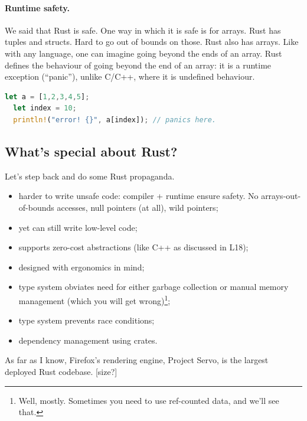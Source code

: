\documentclass[a4paper]{report}
\begin{document}

\paragraph{Runtime safety.} We said that Rust is safe. One way in which it is safe is for
arrays. Rust has tuples and structs. Hard to go out of bounds on those. Rust also has arrays.
Like with any language, one can imagine going beyond the ends of an array. Rust defines
the behaviour of going beyond the end of an array: it is a runtime exception (``panic''),
unlike C/C++, where it is undefined behaviour.

\vspace*{-2em}
\begin{lstlisting}[language=Rust]
  let a = [1,2,3,4,5];
  let index = 10;
  println!("error! {}", a[index]); // panics here.
\end{lstlisting}

\subsection*{What's special about Rust?}
Let's step back and do some Rust propaganda.
\begin{itemize}[noitemsep]
\item harder to write unsafe code: compiler + runtime ensure safety. No arrays-out-of-bounds accesses, null pointers (at all), wild pointers;
\item yet can still write low-level code;
\item supports zero-cost abstractions (like C++ as discussed in L18);
\item designed with ergonomics in mind;
\item type system obviates need for either garbage collection or manual memory management (which you will get wrong)\footnote{Well, mostly. Sometimes you need to use ref-counted data, and we'll see that.};
\item type system prevents race conditions;
\item dependency management using crates.
\end{itemize}
As far as I know, Firefox's rendering engine, Project Servo, is the largest deployed Rust codebase. [size?]
\end{document}
